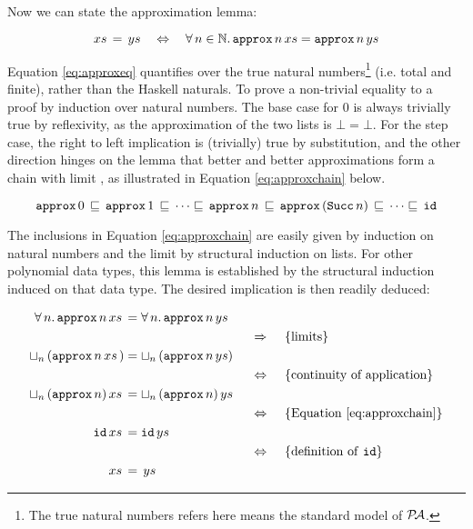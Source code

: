 Now we can state the approximation lemma:

\begin{equation}
\label{eq:approxeq}
xs \, = \, ys \quad \Leftrightarrow \quad \forall \, n \in \mathbb{N} . \, \texttt{approx} \, n \, xs = \texttt{approx} \, n \, ys
\end{equation}

Equation \ref{eq:approxeq} quantifies over the true natural
numbers\footnote{The true natural numbers refers here means the
  standard model of $\mathcal{P\!A}$.} (i.e. total and finite), rather than the
Haskell naturals. To prove a non-trivial equality to a proof by
induction over natural numbers. The base case for $0$ is always
trivially true by reflexivity, as the approximation of the two lists
is $\bot = \bot$. For the step case, the right to left implication is
(trivially) true by substitution, and the other direction hinges on
the lemma that better and better approximations form a chain with
limit , as illustrated in Equation \ref{eq:approxchain} below.

\begin{equation}
\label{eq:approxchain}
\texttt{approx} \, 0 \,
   \sqsubseteq \,
\texttt{approx} \, 1 \,
   \sqsubseteq \,
\cdots
   \sqsubseteq \,
\texttt{approx} \, n \,
   \sqsubseteq \,
\texttt{approx} \, (\texttt{Succ} \, n) \,
   \sqsubseteq \,
\cdots
   \sqsubseteq \,
\texttt{id}
\end{equation}

The inclusions in Equation \ref{eq:approxchain} are easily given by
induction on natural numbers and the limit by structural induction on
lists. For other polynomial data types, this lemma is established by
the structural induction induced on that data type. The desired
implication is then readily deduced:

\begin{align*}
\xsys{\fa{n} \hs{approx} \, n}{}            \\
\descra{limits}                             \\
\xsys{\lub{n} \, (\hs{approx} \, n}{)}      \\
\desclra{continuity of application}   \\
\xsys{\lub{n} \, (\hs{approx} \, n)}{}      \\
\desclra{Equation \ref{eq:approxchain}} \\
\xsys{\hs{id}}{}                            \\
\desclra{definition of \hs{id}}       \\
\xsys{}{}                                   \\
\end{align*}

